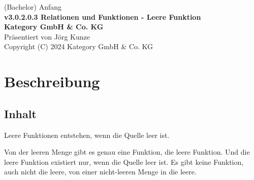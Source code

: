 \documentclass[a4paper]{amsart}
\theoremstyle{definition}
\begin{document}
\begin{titlepage}
\centering
{\huge
(Bachelor) Anfang\\[1cm]
\textbf{v3.0.2.0.3 Relationen und Funktionen - Leere Funktion}
}\\[1cm]

\textbf{Kategory GmbH \& Co. KG}\\
Präsentiert von Jörg Kunze\\
Copyright (C) 2024 Kategory GmbH \& Co. KG

\end{titlepage}

%

\newpage

\section*{Beschreibung}

\subsection*{Inhalt}
Leere Funktionen entstehen, wenn die Quelle leer ist. 

Von der leeren Menge gibt es genau eine Funktion, die leere Funktion. Und die leere Funktion existiert nur, wenn die Quelle leer ist. Es gibt keine Funktion, auch nicht die leere, von einer nicht-leeren Menge in die leere.
\end{document}

